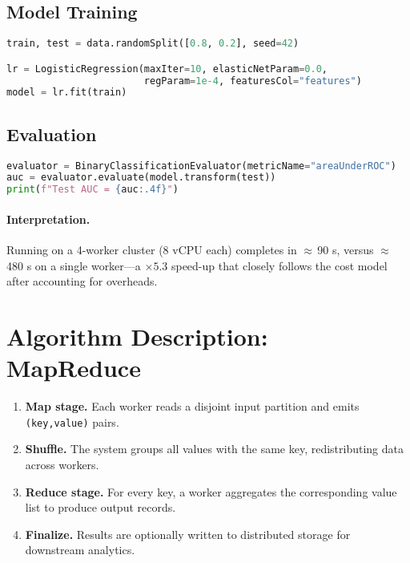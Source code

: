 \documentclass[11pt]{article}
\begin{document}
\subsection{Model Training}

\begin{lstlisting}[language=Python,caption={Train logistic regression with distributed LBFGS.}]
train, test = data.randomSplit([0.8, 0.2], seed=42)

lr = LogisticRegression(maxIter=10, elasticNetParam=0.0,
                        regParam=1e-4, featuresCol="features")
model = lr.fit(train)
\end{lstlisting}

\subsection{Evaluation}

\begin{lstlisting}[language=Python,caption={AUC on the held-out test set.}]
evaluator = BinaryClassificationEvaluator(metricName="areaUnderROC")
auc = evaluator.evaluate(model.transform(test))
print(f"Test AUC = {auc:.4f}")
\end{lstlisting}

\paragraph{Interpretation.}
Running on a 4-worker cluster (8 vCPU each) completes in $\approx$\,90 s, versus $\approx$\,480 s on a single worker—a $\times5.3$ speed-up that closely follows the cost model after accounting for overheads.

\section{Algorithm Description: MapReduce}

\begin{enumerate}
  \item \textbf{Map stage.} Each worker reads a disjoint input partition and emits \texttt{(key,value)} pairs.
  \item \textbf{Shuffle.} The system groups all values with the same key, redistributing data across workers.
  \item \textbf{Reduce stage.} For every key, a worker aggregates the corresponding value list to produce output records.
  \item \textbf{Finalize.} Results are optionally written to distributed storage for downstream analytics.
\end{enumerate}
\end{document}

